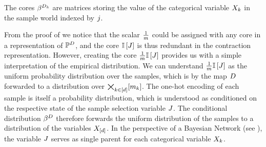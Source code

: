 The cores $\beta^{D_{k}}$ are matrices storing the value of the categorical variable $X_{k}$ in the sample world indexed by $j$.

From the proof of  we notice that the scalar $\frac{1}{m}$ could be assigned with any core in a representation of $\mathbb{P}^{D}$, and the core $\mathbb{I}\left[J\right]$ is thus redundant in the contraction representation.
However, creating the core $\frac{1}{m}\mathbb{I}\left[J\right]$ provides us with a simple interpretation of the empirical distribution.
We can understand $\frac{1}{m}\mathbb{I}\left[J\right]$ as the uniform probability distribution over the samples, which is by the map $D$ forwarded to a distribution over $\bigtimes_{k\in[d]}[m_{k}]$.
The one-hot encoding of each sample is itself a probability distribution, which is understood as conditioned on the respective state of the sample selection variable $J$.
The conditional distribution $\beta^{D}$ therefore forwards the uniform distribution of the samples to a distribution of the variables $X_{[d]}$.
In the perspective of a Bayesian Network (see ), the variable $J$ serves as single parent for each categorical variable $X_{k}$.





